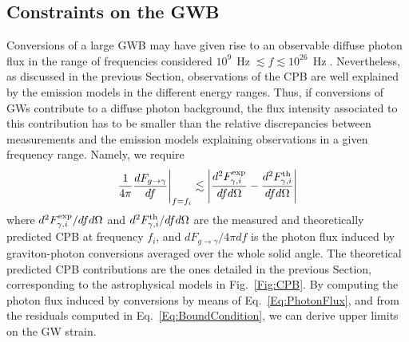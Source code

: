 \documentclass[twocolumn,superscriptaddress,floatfix,preprintnumbers, nofootinbib,hyperref]{revtex4-2}
\DeclareMathOperator{\Hz}{Hz}
\begin{document}
\subsection{Constraints on the GWB}
\label{subsec:Results}

Conversions of a large GWB may have given rise to an observable diffuse photon flux in the range of frequencies considered $10^{9}\,\Hz\lesssim f\lesssim10^{26}\,\Hz$.
Nevertheless, as discussed in the previous Section, observations of the CPB are well explained by the emission models in the different energy ranges. Thus, if conversions of GWs  contribute to a diffuse photon background, the flux intensity associated to this contribution has to be smaller than the relative discrepancies between measurements and the emission models explaining observations in a given frequency range. Namely, we require
\begin{equation}
    \frac{1}{4\pi}\frac{dF_{g\rightarrow \gamma}}{df}\Bigg{|}_{f=f_i}\lesssim\left|\frac{d^2F_{\gamma,i}^{\rm exp}}{dfd\Omega}-\frac{d^2F_{\gamma,i}^{\rm th}}{dfd\Omega}\right|
\label{Eq:BoundCondition}
\end{equation}
where ${d^2F_{\gamma,i}^{\rm exp}}/{dfd\Omega}$ and ${d^2F_{\gamma,i}^{\rm th}}/{dfd\Omega}$ are the measured and theoretically predicted CPB at frequency $f_i$, and ${dF_{g \rightarrow\gamma}}/{4\pi df}$ is the photon flux induced by graviton-photon conversions averaged over the whole solid angle. 
The theoretical predicted CPB contributions are the ones detailed in the previous Section, corresponding to the astrophysical models in Fig.~\ref{Fig:CPB}. By computing the photon flux induced by conversions by means of Eq.~\eqref{Eq:PhotonFlux}, and from the residuals computed in Eq.~\ref{Eq:BoundCondition}, we can derive upper limits on the GW strain.
\end{document}
